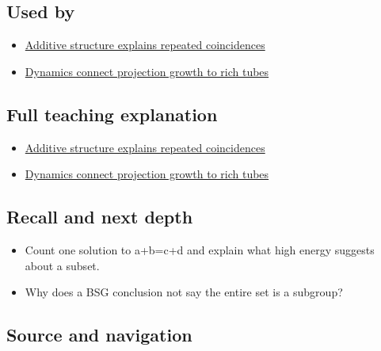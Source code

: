 \subsection{Used by}\label{appendix-b0732b22e7d6-used-by}

\begin{itemize}
\tightlist
\item
  \hyperref[04-visual-computing-ii-ch033-additive-structure-explains-repeated-coincidences]{Additive structure explains repeated coincidences}
\item
  \hyperref[04-visual-computing-ii-ch033-dynamics-connect-projection-growth-to-rich-tubes]{Dynamics connect projection growth to rich tubes}
\end{itemize}

\subsection{Full teaching explanation}\label{appendix-b0732b22e7d6-full-teaching-explanation}

\begin{itemize}
\tightlist
\item
  \hyperref[04-visual-computing-ii-ch033-additive-structure-explains-repeated-coincidences]{Additive structure explains repeated coincidences}
\item
  \hyperref[04-visual-computing-ii-ch033-dynamics-connect-projection-growth-to-rich-tubes]{Dynamics connect projection growth to rich tubes}
\end{itemize}

\subsection{Recall and next depth}\label{appendix-b0732b22e7d6-recall-and-next-depth}

\begin{itemize}
\tightlist
\item
  Count one solution to a+b=c+d and explain what high energy suggests about a subset.
\item
  Why does a BSG conclusion not say the entire set is a subgroup?
\end{itemize}

\subsection{Source and navigation}\label{appendix-b0732b22e7d6-source-and-navigation}

